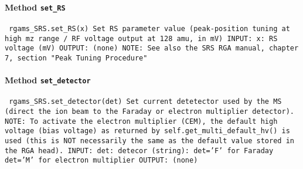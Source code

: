 \paragraph{Method \texttt{set_RS}}
\vspace{1ex}
\texttt{\newline
rgams_SRS.set_RS(x)\newline
\newline
Set RS parameter value (peak-position tuning at high mz range  / RF voltage output at 128 amu, in mV)\newline
\newline
INPUT:\newline
x: RS voltage (mV)\newline
\newline
OUTPUT:\newline
(none)\newline
\newline
NOTE:\newline
See also the SRS RGA manual, chapter 7, section "Peak Tuning Procedure"\newline
\newline
}

\paragraph{Method \texttt{set_detector}}
\vspace{1ex}
\texttt{\newline
rgams_SRS.set_detector(det)\newline
\newline
Set current detetector used by the MS (direct the ion beam to the Faraday or electron multiplier detector).\newline
NOTE: To activate the electron multiplier (CEM), the default high voltage (bias voltage) as returned by self.get_multi_default_hv() is used (this is NOT necessarily the same as the default value stored in the RGA head).\newline
\newline
INPUT:\newline
det: detecor (string):\newline
det='F' for Faraday\newline
det='M' for electron multiplier\newline
\newline
OUTPUT:\newline
(none)\newline
\newline
}

